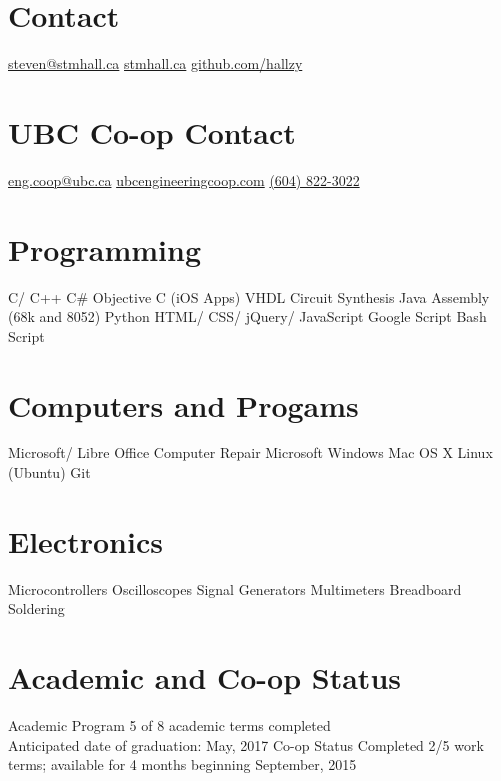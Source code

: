 \documentclass[]{friggeri-cv} %
\begin{document}


\begin{aside} %
\section{Contact}
\href{mailto:steven@stmhall.ca}{steven@stmhall.ca}
\href{http://stmhall.ca}{stmhall.ca}
\href{http://github.com/hallzy}{github.com/hallzy}
\section{UBC Co-op Contact}
\href{mailto:eng.coop@ubc.ca}{eng.coop@ubc.ca}
\href{http://www.ubcengineeringcoop.com}{ubcengineeringcoop.com}
\href{tel:604-822-3022}{(604) 822-3022}
\section{Programming}
C/ C++
C\#
Objective C (iOS Apps)
VHDL Circuit Synthesis
Java
Assembly (68k and 8052)
Python
HTML/ CSS/ jQuery/ JavaScript
Google Script
Bash Script
\section{Computers and Progams}
Microsoft/ Libre Office
Computer Repair
Microsoft Windows
Mac OS X
Linux (Ubuntu)
Git
\section{Electronics}
Microcontrollers
Oscilloscopes
Signal Generators
Multimeters
Breadboard
Soldering
\end{aside}

\section{Academic and Co-op Status}

\begin{entrylist}

\entry
{}
{Academic Program}
{}
{5 of 8 academic terms completed\\
Anticipated date of graduation: May, 2017
}
\entry
{}
{Co-op Status}
{}
{Completed 2/5 work terms; available for 4 months beginning September,
2015
}
\end{entrylist}
\end{document}
